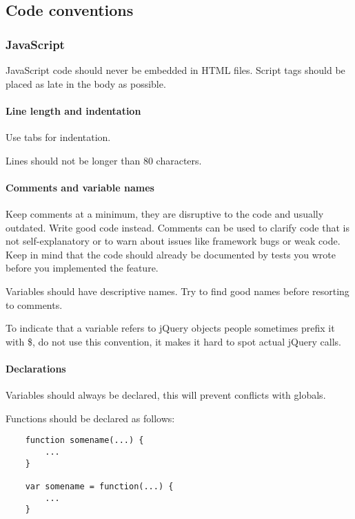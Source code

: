 \subsection{Code conventions}

\subsubsection{JavaScript}

JavaScript code should never be embedded in HTML files. Script tags should be
placed as late in the body as possible. \cite{crockford:code}

\paragraph{Line length and indentation} \hspace{1mm}

Use tabs for indentation. 

Lines should not be longer than 80 characters.

\paragraph{Comments and variable names} \hspace{1mm}

Keep comments at a minimum, they are disruptive to the code and
usually outdated. Write good code instead. Comments can be used to
clarify code that is not self-explanatory or to warn about issues like
framework bugs or weak code. Keep in mind that the code should already
be documented by tests you wrote before you implemented the feature.

Variables should have descriptive names. Try to find good names before
resorting to comments.

To indicate that a variable refers to jQuery objects people sometimes
prefix it with \$, do not use this convention, it makes it hard to
spot actual jQuery calls.

\paragraph{Declarations} \hspace{1mm}

Variables should always be declared, this will prevent conflicts with globals.

Functions should be declared as follows:

\begin{lstlisting}
	function somename(...) {
		...
	}

	var somename = function(...) {
		...
	}
\end{lstlisting}

